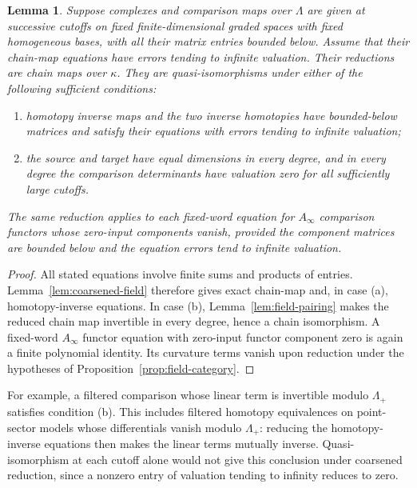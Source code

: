 \documentclass[11pt]{article}
\numberwithin{equation}{section}
\newtheorem{lemma}[theorem]{Lemma}
\theoremstyle{definition}
\theoremstyle{remark}
\begin{document}
\begin{lemma}\label{lem:field-comparisons}
Suppose complexes and comparison maps over $\Lambda$ are given at
successive cutoffs on fixed finite-dimensional graded spaces with
fixed homogeneous bases, with all their matrix entries bounded
below.  Assume that their chain-map equations have
errors tending to infinite valuation.  Their reductions are chain
maps over $\kappa$.  They are quasi-isomorphisms under either of the
following sufficient conditions:
\begin{enumerate}[label=\textup{(\alph*)}]
 \item homotopy inverse maps and the two inverse homotopies have
 bounded-below matrices and satisfy their equations with errors
 tending to infinite valuation;
 \item the source and target have equal dimensions in every degree,
 and in every degree the comparison determinants have valuation zero
 for all sufficiently large cutoffs.
\end{enumerate}
The same reduction applies to each fixed-word equation for
$A_\infty$ comparison functors whose zero-input components vanish,
provided the component matrices are bounded below and the equation
errors tend to infinite valuation.
\end{lemma}

\begin{proof}
All stated equations involve finite sums and products of entries.
Lemma~\ref{lem:coarsened-field} therefore gives exact chain-map and,
in case \textup{(a)}, homotopy-inverse equations.  In case
\textup{(b)}, Lemma~\ref{lem:field-pairing} makes the reduced chain
map invertible in every degree, hence a chain isomorphism.  A
fixed-word $A_\infty$ functor equation with zero-input functor
component zero is again a finite polynomial identity.  Its curvature
terms vanish upon reduction under the hypotheses of
Proposition~\ref{prop:field-category}.
\end{proof}

For example, a filtered comparison whose linear term is invertible
modulo $\Lambda_+$ satisfies condition \textup{(b)}.  This includes
filtered homotopy equivalences on point-sector models whose
differentials vanish modulo $\Lambda_+$: reducing the homotopy-inverse
equations then makes the linear terms mutually inverse.
Quasi-isomorphism at each cutoff alone would not give this conclusion
under coarsened reduction, since a nonzero entry of valuation tending
to infinity reduces to zero.
\end{document}
